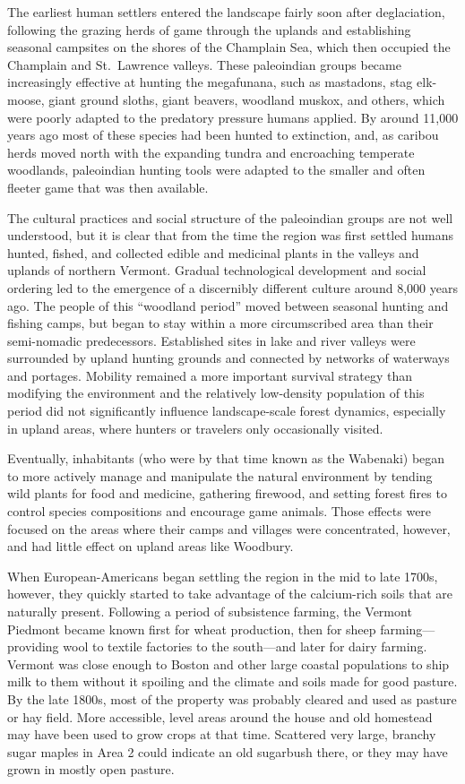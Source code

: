 \documentclass[]{tufte-handout}
\begin{document}
The earliest human settlers entered the landscape fairly soon after
deglaciation, following the grazing herds of game through the uplands
and establishing seasonal campsites on the shores of the Champlain Sea,
which then occupied the Champlain and St.~Lawrence valleys. These
paleoindian groups became increasingly effective at hunting the
megafunana, such as mastadons, stag elk-moose, giant ground sloths,
giant beavers, woodland muskox, and others, which were poorly adapted to
the predatory pressure humans applied. By around 11,000 years ago most
of these species had been hunted to extinction, and, as caribou herds
moved north with the expanding tundra and encroaching temperate
woodlands, paleoindian hunting tools were adapted to the smaller and
often fleeter game that was then available.

The cultural practices and social structure of the paleoindian groups
are not well understood, but it is clear that from the time the region
was first settled humans hunted, fished, and collected edible and
medicinal plants in the valleys and uplands of northern Vermont. Gradual
technological development and social ordering led to the emergence of a
discernibly different culture around 8,000 years ago. The people of this
``woodland period'' moved between seasonal hunting and fishing camps,
but began to stay within a more circumscribed area than their
semi-nomadic predecessors. Established sites in lake and river valleys
were surrounded by upland hunting grounds and connected by networks of
waterways and portages. Mobility remained a more important survival
strategy than modifying the environment and the relatively low-density
population of this period did not significantly influence
landscape-scale forest dynamics, especially in upland areas, where
hunters or travelers only occasionally visited.

Eventually, inhabitants (who were by that time known as the Wabenaki)
began to more actively manage and manipulate the natural environment by
tending wild plants for food and medicine, gathering firewood, and
setting forest fires to control species compositions and encourage game
animals. Those effects were focused on the areas where their camps and
villages were concentrated, however, and had little effect on upland
areas like Woodbury.

When European-Americans began settling the region in the mid to late
1700s, however, they quickly started to take advantage of the
calcium-rich soils that are naturally present. Following a period of
subsistence farming, the Vermont Piedmont became known first for wheat
production, then for sheep farming---providing wool to textile factories
to the south---and later for dairy farming. Vermont was close enough to
Boston and other large coastal populations to ship milk to them without
it spoiling and the climate and soils made for good pasture. By the late
1800s, most of the property was probably cleared and used as pasture or
hay field. More accessible, level areas around the house and old
homestead may have been used to grow crops at that time. Scattered very
large, branchy sugar maples in Area 2 could indicate an old sugarbush
there, or they may have grown in mostly open pasture.
\end{document}
